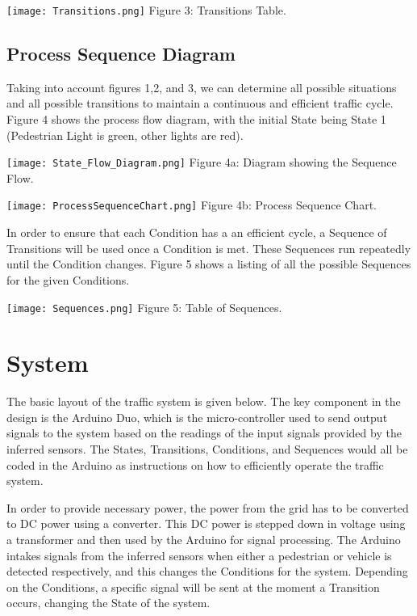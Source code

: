 \documentclass{article}
\begin{document}
\begin{center}
\texttt{[image: Transitions.png]}
\scriptsize{
Figure 3: Transitions Table.
}
\end{center}

\subsection{Process Sequence Diagram}

Taking into account figures 1,2, and 3, we can determine all possible situations and all possible transitions to maintain a continuous and efficient traffic cycle. Figure 4 shows the process flow diagram, with the initial State being State 1 (Pedestrian Light is green, other lights are red).


\begin{center}
\texttt{[image: State\_Flow\_Diagram.png]}
\scriptsize{
Figure 4a: Diagram showing the Sequence Flow.
}
\end{center}

\begin{center}
\texttt{[image: ProcessSequenceChart.png]}
\scriptsize{
Figure 4b: Process Sequence Chart.
}
\end{center}


In order to ensure that each Condition has a an efficient cycle, a Sequence of Transitions will be used once a Condition is met. These Sequences run repeatedly until the Condition changes. Figure 5 shows a listing of all the possible Sequences for the given Conditions.

\begin{center}
\texttt{[image: Sequences.png]}
\scriptsize{
Figure 5: Table of Sequences.
}
\end{center}

\section{System}
The basic layout of the traffic system is given below. The key component in the design is the Arduino Duo, which is the micro-controller used to send output signals to the system based on the readings of the input signals provided by the inferred sensors. The States, Transitions, Conditions, and Sequences would all be coded in the Arduino as instructions on how to efficiently operate the traffic system.

In order to provide necessary power, the power from the grid has to be converted to DC power using a converter. This DC power is stepped down in voltage using a transformer and then used by the Arduino for signal processing. The Arduino intakes signals from the inferred sensors when either a pedestrian or vehicle is detected respectively, and this changes the Conditions for the system. Depending on the Conditions, a specific signal will be sent at the moment a Transition occurs, changing the State of the system. 
\end{document}
